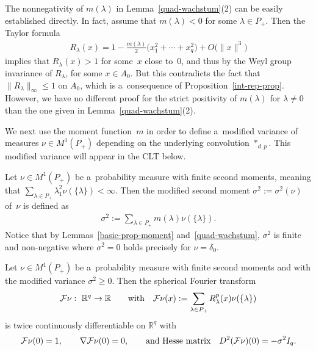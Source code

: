 \begin{Remark}
The nonnegativity of $m(\lambda)$ in Lemma~\ref{quad-wachstum}(2) can be easily established directly.
In fact, assume that $m(\lambda)<0$ for some $\lambda\in P_+$.
Then the Taylor formula
\begin{gather*}
R_\lambda(x)=1-\frac{m(\lambda)}{2}\big(x_1^2+\cdots+x_q^2\big)+O\big(\|x\|^3\big)
\end{gather*}
implies that $R_\lambda(x)>1$ for some~$x$ close to~$0$, and thus by the Weyl group invariance of $R_\lambda$, for some
$x\in A_0$.
But this contradicts the fact that $\|R_\lambda\|_\infty\le1$ on $A_0$, which is a~consequence of
Proposition~\ref{int-rep-prop}.
However, we have no dif\/ferent proof for the strict positivity of $m(\lambda)$ for $\lambda\ne 0$ than the one given in
Lemma~\ref{quad-wachstum}(2).
\end{Remark}

We next use the moment function~$m$ in order to def\/ine a~modif\/ied variance of measures $\nu\in M^1(P_+)$ depending on
the underlying convolution $*_{d,p}$.
This modif\/ied variance will appear in the CLT below.

\begin{Definition}
Let $\nu\in M^1(P_+)$ be a~probability measure with f\/inite second moments, meaning that $\sum\limits_{\lambda\in P_+}
\lambda_1^2 \nu(\{\lambda\})<\infty$. Then the modif\/ied second moment $\sigma^2:=\sigma^2(\nu)$ of~$\nu$ is def\/ined as
\begin{gather*}
\sigma^2:=\sum\limits_{\lambda\in P_+} m(\lambda) \nu(\{\lambda\}).
\end{gather*}
Notice that by Lemmas~\ref{basic-prop-moment} and~\ref{quad-wachstum}, $\sigma^2$ is f\/inite and non-negative where
$\sigma^2=0$ holds precisely for $\nu=\delta_0$.
\end{Definition}

\begin{Lemma}
\label{diffbar}
Let $\nu\in M^1(P_+)$ be a~probability measure with finite second moments and with the modified variance $\sigma^2\ge0$.
Then the spherical Fourier transform
\begin{gather*}
{\cal F}\nu: \ \mathbb R^q\to\mathbb R
\qquad
\text{with}
\quad
{\cal F}\nu(x):=\sum\limits_{\lambda\in P_+} R_\lambda^p(x) \nu(\{\lambda\})
\end{gather*}
is twice continuously differentiable on $\mathbb R^q$ with
\begin{gather*}
{\cal F}\nu(0)=1,
\qquad
\nabla{\cal F}\nu(0)=0,
\qquad
\text{and Hesse matrix}
\quad
D^2({\cal F}\nu)(0)=-\sigma^2  I_q.
\end{gather*}
\end{Lemma}

